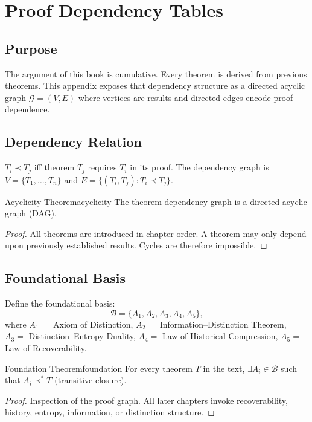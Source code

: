 \documentclass[12pt,twoside,openright]{book}
\begin{document}
\chapter{Proof Dependency Tables}
\label{app:deps}

\section{Purpose}

The argument of this book is cumulative.
Every theorem is derived from previous theorems.
This appendix exposes that dependency structure as a
directed acyclic graph $\mathcal{G} = (V, E)$
where vertices are results and directed edges encode
proof dependence.

\section{Dependency Relation}

$T_i \prec T_j$ iff theorem $T_j$ requires $T_i$
in its proof. The dependency graph is
$V = \{T_1, \ldots, T_n\}$ and
$E = \{(T_i, T_j) : T_i \prec T_j\}$.

\begin{theorem}{Acyclicity Theorem}{acyclicity}
  The theorem dependency graph is a directed acyclic
  graph (DAG).
\end{theorem}

\begin{proof}
  All theorems are introduced in chapter order.
  A theorem may only depend upon previously established
  results. Cycles are therefore impossible.
\end{proof}

\section{Foundational Basis}

Define the foundational basis:
\[
  \mathcal{B}
  = \{A_1, A_2, A_3, A_4, A_5\},
\]
where $A_1 =$ Axiom of Distinction,
$A_2 =$ Information--Distinction Theorem,
$A_3 =$ Distinction--Entropy Duality,
$A_4 =$ Law of Historical Compression,
$A_5 =$ Law of Recoverability.

\begin{theorem}{Foundation Theorem}{foundation}
  For every theorem $T$ in the text, $\exists A_i \in
  \mathcal{B}$ such that $A_i \prec^* T$
  (transitive closure).
\end{theorem}

\begin{proof}
  Inspection of the proof graph. All later chapters
  invoke recoverability, history, entropy, information,
  or distinction structure.
\end{proof}
\end{document}
